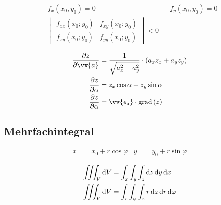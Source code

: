 \begin{boxleft}
\end{boxleft}\begin{boxrightshaded}
\begin{align*}
&f_x(x_0,y_0)=0&&f_y(x_0,y_0)=0\\
&\begin{vmatrix}f_{xx}(x_0;y_0)&f_{xy}(x_0;y_0)\\f_{xy}(x_0;y_0)&f_{yy}(x_0;y_0)\end{vmatrix}<0
\end{align*}
\end{boxrightshaded}


\begin{boxleft}
\end{boxleft}\begin{boxrightshaded}
\begin{align*}
\frac{\partial z}{\partial \vv{a}}&=\frac{1}{\sqrt{a_x^2+a_y^2}}\cdot\left(a_xz_x+a_yz_y\right)\\
\frac{\partial z}{\partial \alpha}&=z_x\cos\alpha+z_y\sin\alpha\\
\frac{\partial z}{\partial \alpha}&=\vv{e_a}\cdot \grad\left(z\right)
\end{align*}
\end{boxrightshaded}

\subsection{Mehrfachintegral}

\begin{boxleft}
\end{boxleft}\begin{boxrightshaded}
\begin{align*}
x&=x_0+r\cos\varphi&y&=y_0+r\sin\varphi
\end{align*}
\end{boxrightshaded}

\begin{boxleft}
\end{boxleft}\begin{boxrightshaded}
\begin{align*}
\iiint_{V}\diff V&=\int_x\int_y\int_z \diff z\diff y\diff x\\
\iiint_{V}\diff V&=\int_r\int_\varphi\int_z r\diff z\diff r \diff \varphi\\
\end{align*}
\end{boxrightshaded}

